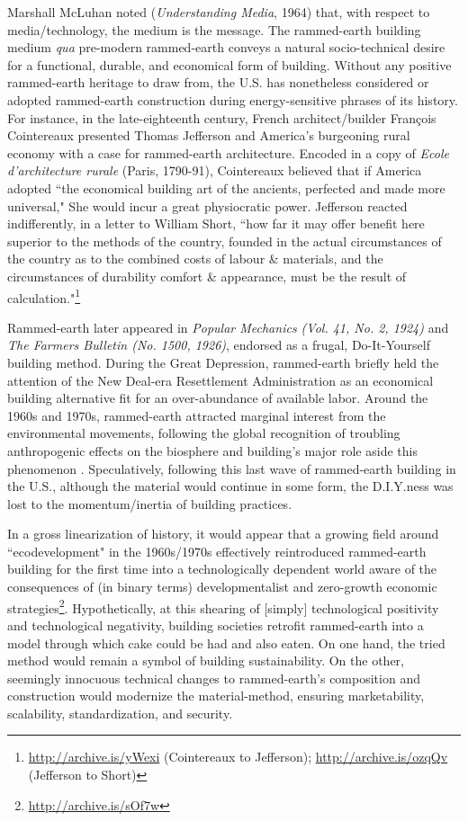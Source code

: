 Marshall McLuhan noted (\textit{Understanding Media}, 1964) that, with respect to media/technology, the medium is the message. The rammed-earth building medium \textit{qua} pre-modern rammed-earth conveys a natural socio-technical desire for a functional, durable, and economical form of building. Without any positive rammed-earth heritage to draw from, the U.S. has nonetheless considered or adopted rammed-earth construction during energy-sensitive phrases of its history. For instance, in the late-eighteenth century, French architect/builder Fran\c cois Cointereaux presented Thomas Jefferson and America's burgeoning rural economy with a case for rammed-earth architecture. Encoded in a copy of \textit{Ecole d'architecture rurale} (Paris, 1790-91), Cointereaux believed that if America adopted ``the economical building art of the ancients, perfected and made more universal," She would incur a great physiocratic power. Jefferson reacted indifferently, in a letter to William Short, ``how far it may offer benefit here superior to the methods of the country, founded in the actual circumstances of the country as to the combined costs of labour \& materials, and the circumstances of durability comfort \& appearance, must be the result of calculation."\footnote{\url{http://archive.is/yWexi} (Cointereaux to Jefferson); \url{http://archive.is/ozqQv} (Jefferson to Short)}

Rammed-earth later appeared in \textit{Popular Mechanics (Vol. 41, No. 2, 1924)} and \textit{The Farmers Bulletin  (No. 1500, 1926)}, endorsed as a frugal, Do-It-Yourself building method. During the Great Depression, rammed-earth briefly held the attention of the New Deal-era Resettlement Administration as an economical building alternative fit for an over-abundance of available labor. Around the 1960s and 1970s, rammed-earth attracted marginal interest from the environmental movements, following the global recognition of troubling anthropogenic effects on the biosphere and building's major role aside this phenomenon \cite{GARDENDALE}. Speculatively, following this last wave of rammed-earth building in the U.S., although the material would continue in some form, the D.I.Y.ness was lost to the momentum/inertia of building practices.

In a gross linearization of history, it would appear that a growing field around ``ecodevelopment" in the 1960s/1970s effectively reintroduced rammed-earth building for the first time into a technologically dependent world aware of the consequences of (in binary terms) developmentalist and zero-growth economic strategies\footnote{\url{http://archive.is/sOf7w}}. Hypothetically, at this shearing of [simply] technological positivity and technological negativity, building societies retrofit rammed-earth into a model through which cake could be had and also eaten. On one hand, the tried method would remain a symbol of building sustainability. On the other, seemingly innocuous technical changes to rammed-earth's composition and construction would modernize the material-method, ensuring marketability, scalability, standardization, and security.


